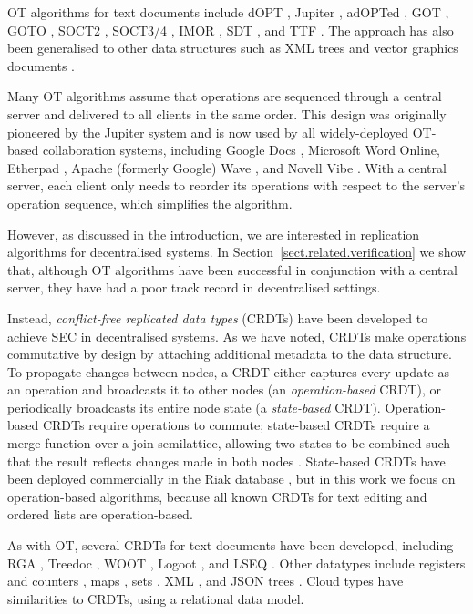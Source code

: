 OT algorithms for text documents include dOPT \cite{Ellis:1989ue}, Jupiter \cite{Nichols:1995fd}, adOPTed \cite{Ressel:1996wx}, GOT \cite{Sun:1998un}, GOTO \cite{Sun:1998vf}, SOCT2 \cite{Suleiman:1997gl,Suleiman:1998eu}, SOCT3/4 \cite{Vidot:2000ch}, IMOR \cite{Imine:2003ks}, SDT \cite{Li:2004er,Li:2008hw}, and TTF \cite{Oster:2006tr}.
The approach has also been generalised to other data structures such as XML trees \cite{Ignat:2003jy,Davis:2002iv,Jungnickel:2015ua} and vector graphics documents \cite{Sun:2002jb}.

Many OT algorithms assume that operations are sequenced through a central server and delivered to all clients in the same order.
This design was originally pioneered by the Jupiter system \cite{Nichols:1995fd} and is now used by all widely-deployed OT-based collaboration systems, including Google Docs \cite{DayRichter:2010tt}, Microsoft Word Online, Etherpad \cite{Etherpad:2011um}, Apache (formerly Google) Wave \cite{Wang:2015vo}, and Novell Vibe \cite{Spiewak:2010vw}.
With a central server, each client only needs to reorder its operations with respect to the server's operation sequence, which simplifies the algorithm.

However, as discussed in the introduction, we are interested in replication algorithms for decentralised systems.
In Section~\ref{sect.related.verification} we show that, although OT algorithms have been successful in conjunction with a central server, they have had a poor track record in decentralised settings.

Instead, \emph{conflict-free replicated data types} (CRDTs) have been developed to achieve SEC in decentralised systems.
As we have noted, CRDTs make operations commutative by design by attaching additional metadata to the data structure.
To propagate changes between nodes, a CRDT either captures every update as an operation and broadcasts it to other nodes (an \emph{operation-based} CRDT), or periodically broadcasts its entire node state (a \emph{state-based} CRDT).
Operation-based CRDTs require operations to commute; state-based CRDTs require a merge function over a join-semilattice, allowing two states to be combined such that the result reflects changes made in both nodes \cite{Shapiro:2011wy,Shapiro:2011un}.
State-based CRDTs have been deployed commercially in the Riak database \cite{Brown:2014hs}, but in this work we focus on operation-based algorithms, because all known CRDTs for text editing and ordered lists are operation-based.

As with OT, several CRDTs for text documents have been developed, including RGA \cite{Roh:2011dw}, Treedoc \cite{Preguica:2009fz}, WOOT \cite{Oster:2006wj}, Logoot \cite{Weiss:2010hx}, and LSEQ \cite{Nedelec:2013ky,Nedelec:2016eo}.
Other datatypes include registers and counters \cite{Shapiro:2011wy,Shapiro:2011un}, maps \cite{Baquero:2016iv}, sets \cite{Bieniusa:2012wu,Bieniusa:2012gt}, XML \cite{Martin:2010ih}, and JSON trees \cite{Kleppmann:2016ve}.
Cloud types \cite{Burckhardt:2012jy} have similarities to CRDTs, using a relational data model.


